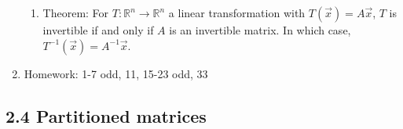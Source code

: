 \documentclass{article}
\begin{document}
\begin{enumerate}
\begin{enumerate}
\item Theorem: For $T:\mathbb{R}^n \rightarrow \mathbb{R}^n$ a linear transformation with $T(\vec{x})=A\vec{x}$, $T$ is invertible if and only if $A$ is an invertible matrix. In which case, $T^{-1}(\vec{x}) = A^{-1} \vec{x}$.
\end{enumerate}

\item Homework: 1-7 odd, 11, 15-23 odd, 33


\end{enumerate}

\subsection{2.4 Partitioned matrices}
\end{document}
